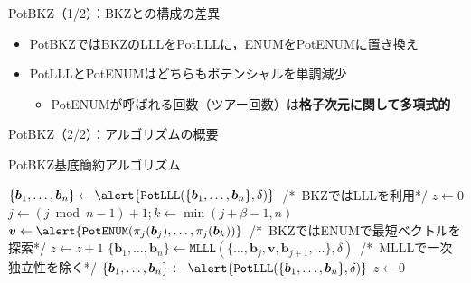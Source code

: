 \documentclass[12pt,aspectratio=169,xcolor=dvipsnames,table,dvipdfmx, leqno]{beamer}
\begin{document}
\begin{frame}{PotBKZ（1/2）：BKZとの構成の差異}
\begin{figure}[htbp]
\end{figure}
\begin{itemize}
    \item PotBKZではBKZのLLLをPotLLLに，ENUMをPotENUMに置き換え
    \item PotLLLとPotENUMはどちらもポテンシャルを単調減少
    \begin{itemize}
        \item PotENUMが呼ばれる回数（ツアー回数）は\alert{\textbf{格子次元に関して多項式的}}
    \end{itemize}
\end{itemize}
\end{frame}

\begin{frame}[fragile]{PotBKZ（2/2）：アルゴリズムの概要}
\begin{algorithm}[H]
    \footnotesize
    \begin{algorithmic}[1]
        \caption{\footnotesize PotBKZ基底簡約アルゴリズム}
        \State $\{\bm{b}_1,\ldots,\bm{b}_n\}\gets \alert{\texttt{PotLLL}(\{\bm{b}_1,\ldots,\bm{b}_n\}, \delta)}$~/*~BKZ\cite{SE94}ではLLL\cite{LLL82}を利用*/
        \State $z \gets 0$
            \State $j \gets (j \bmod{n-1}) + 1; k \gets \min(j + \beta-1, n)$
            \State $\bm{v}\gets \alert{\texttt{PotENUM}(\pi_j(\bm{b}_j), \dots, \pi_j(\bm{b}_k))}$~/*~BKZではENUM\cite{GNR10}で最短ベクトルを探索*/
                \State $z\gets z+1$
            \Else
                \State $\{\bm{b}_1,\ldots,\bm{b}_n\}\gets \texttt{MLLL}(\{\ldots,\bm{b}_j, \bm{v},\bm{b}_{j+1},\ldots\}, \delta)$~/*~MLLL\cite{SE94}で一次独立性を除く*/
                \State $\{\bm{b}_1,\ldots,\bm{b}_n\}\gets \alert{\texttt{PotLLL}(\{\bm{b}_1,\ldots,\bm{b}_n\}, \delta)}$
                \State $z\gets 0$
            \EndIf
        \EndWhile
    \end{algorithmic}
\end{algorithm}
\end{frame}
\end{document}
